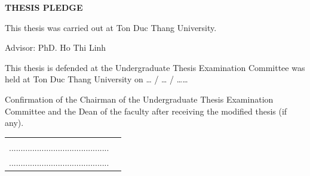 \cleardoublepage %
\pagestyle{empty} %

\begin{center}
    \textbf{\Large THESIS PLEDGE}
\end{center}

\vspace{0.5cm}



This thesis was carried out at Ton Duc Thang University.

Advisor: PhD. Ho Thi Linh

\vspace{0.2cm}

This thesis is defended at the Undergraduate Thesis Examination Committee was held at Ton Duc Thang University on … / … / ……

Confirmation of the Chairman of the Undergraduate Thesis Examination Committee and the Dean of the faculty after receiving the modified thesis (if any).

\vspace{2cm}

\begin{center}
\begin{tabular}{cc}
    \begin{minipage}{0.45\textwidth}
        \centering
        \textbf{CHAIRMAN}\\[2cm]
        ...........................................
    \end{minipage}
    &
    \begin{minipage}{0.45\textwidth}
        \centering
        \textbf{DEAN OF FACULTY}\\[2cm]
        ...........................................
    \end{minipage}
\end{tabular}
\end{center}